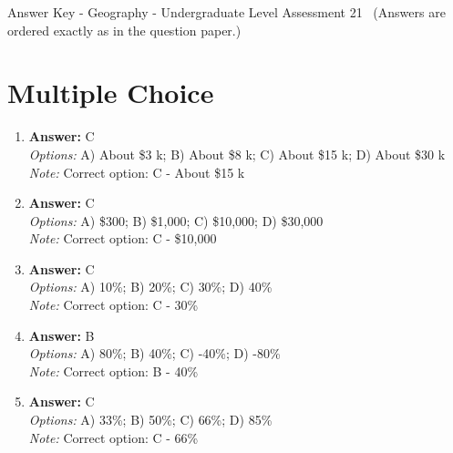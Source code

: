 \documentclass[12pt]{article}
\begin{document}
\begin{center}
Answer Key - Geography - Undergraduate Level Assessment 21 \
\small (Answers are ordered exactly as in the question paper.)
\end{center}

\section*{Multiple Choice}
\begin{enumerate}[label=\arabic*.]
\item \textbf{Answer:} C
\\ \textit{Options:} A) About \$3 k; B) About \$8 k; C) About \$15 k; D) About \$30 k
\\ \textit{Note:} Correct option: C - About \$15 k
\item \textbf{Answer:} C
\\ \textit{Options:} A) \$300; B) \$1,000; C) \$10,000; D) \$30,000
\\ \textit{Note:} Correct option: C - \$10,000
\item \textbf{Answer:} C
\\ \textit{Options:} A) 10\%; B) 20\%; C) 30\%; D) 40\%
\\ \textit{Note:} Correct option: C - 30\%
\item \textbf{Answer:} B
\\ \textit{Options:} A) 80\%; B) 40\%; C) -40\%; D) -80\%
\\ \textit{Note:} Correct option: B - 40\%
\item \textbf{Answer:} C
\\ \textit{Options:} A) 33\%; B) 50\%; C) 66\%; D) 85\%
\\ \textit{Note:} Correct option: C - 66\%
\end{enumerate}
\end{document}
